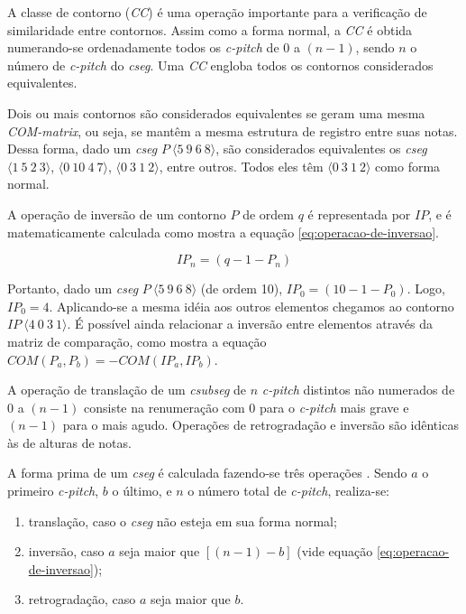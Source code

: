 \documentclass[brazil]{article}
\newcommand{\termo}[1]{\textit{#1}}
\begin{document}
A classe de contorno (\termo{CC}) é uma operação importante para a
verificação de similaridade entre contornos. Assim como a forma
normal, a \termo{CC} é obtida numerando-se ordenadamente todos os
\termo{c-pitch} de $0$ a $(n-1)$, sendo $n$ o número de
\termo{c-pitch} do \termo{cseg}. Uma \termo{CC} engloba todos os
contornos considerados equivalentes.

Dois ou mais contornos são considerados equivalentes se geram uma
mesma \termo{COM-matrix}, ou seja, se mantêm a mesma estrutura de
registro entre suas notas. Dessa forma, dado um \termo{cseg}
$P\:\langle5\:9\:6\:8\rangle$, são considerados equivalentes os
\termo{cseg} $\langle1\:5\:2\:3\rangle$, $\langle0\:10\:4\:7\rangle$,
$\langle0\:3\:1\:2\rangle$, entre outros. Todos eles têm
$\langle0\:3\:1\:2\rangle$ como forma normal.

A operação de inversão de um contorno $P$ de ordem $q$ é representada
por $IP$, e é matematicamente calculada como mostra a equação
\ref{eq:operacao-de-inversao}.

\begin{equation}
  \label{eq:operacao-de-inversao}
  IP_n=(q-1-P_n)
\end{equation}

Portanto, dado um \termo{cseg} $P\:\langle5\:9\:6\:8\rangle$ (de ordem
10), $IP_0=(10-1-P_0)$. Logo, $IP_0=4$. Aplicando-se a mesma idéia aos
outros elementos chegamos ao contorno
$IP\:\langle4\:0\:3\:1\rangle$. É possível ainda relacionar a inversão
entre elementos através da matriz de comparação, como mostra a equação
$COM(P_a,P_b)=-COM(IP_a,IP_b)$.

A operação de translação de um \termo{csubseg} de $n$ \termo{c-pitch}
distintos não numerados de $0$ a $(n-1)$ consiste na renumeração com
$0$ para o \termo{c-pitch} mais grave e $(n-1)$ para o mais
agudo. Operações de retrogradação e inversão são idênticas às de
alturas de notas.

A forma prima de um \termo{cseg} é calculada fazendo-se três operações
\cite{marvin.ea87:relating}. Sendo $a$ o primeiro \termo{c-pitch}, $b$
o último, e $n$ o número total de \termo{c-pitch}, realiza-se:
\begin{enumerate}
\item translação, caso o \termo{cseg} não esteja em sua forma normal;
\item inversão, caso $a$ seja maior que $[(n-1) - b]$ (vide equação
  \ref{eq:operacao-de-inversao});
\item retrogradação, caso $a$ seja maior que $b$.
\end{enumerate}
\end{document}
